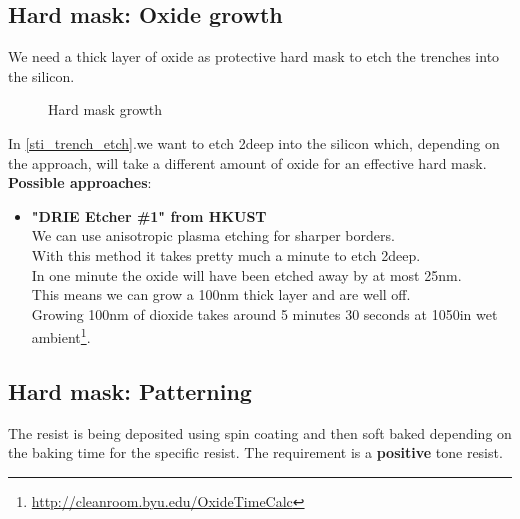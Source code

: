 \newpage

\subsection{Hard mask: Oxide growth}
We need a thick layer of oxide as protective hard mask to etch the trenches into the silicon.

\begin{figure}[H]
	\centering
	\begin{tikzpicture}[node distance = 3cm, auto, thick,scale=\CrossSectionOnly, every node/.style={transform shape}]
		
	\end{tikzpicture}
	\begin{tikzpicture}[node distance = 3cm, auto, thick,scale=\CrossSectionOnly, every node/.style={transform shape}]
		
	\end{tikzpicture}
	\caption{Hard mask growth}
\end{figure}

In \autoref{sti_trench_etch}.we want to etch 2\um deep into the silicon which, depending on the approach, will take a different amount of oxide for an effective hard mask. \\

\textbf{Possible approaches}:
\begin{itemize}
	\item \textbf{"DRIE Etcher \#1" from HKUST} \\
	We can use anisotropic plasma etching for sharper borders. \\
	With this method it takes pretty much a minute to etch 2\um deep. \\
	In one minute the oxide will have been etched away by at most 25nm. \\
	This means we can grow a 100nm thick layer and are well off. \\
	Growing 100nm of dioxide takes around 5 minutes 30 seconds at 1050\degreesC in wet ambient\footnote{\url{http://cleanroom.byu.edu/OxideTimeCalc}}.
\end{itemize}

\subsection{Hard mask: Patterning}

The resist is being deposited using spin coating and then soft baked depending on the baking time for the specific resist.
The requirement is a \textbf{positive} tone resist.

